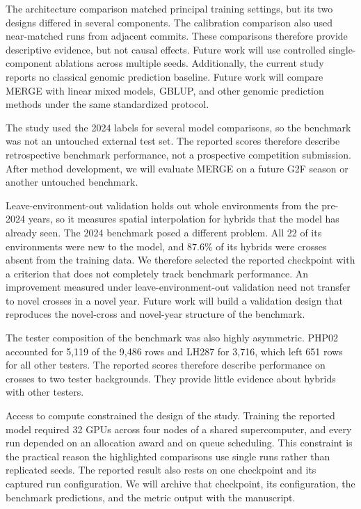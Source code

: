 The architecture comparison matched principal training settings, but its two designs differed in several components. The calibration comparison also used near-matched runs from adjacent commits. These comparisons therefore provide descriptive evidence, but not causal effects. Future work will use controlled single-component ablations across multiple seeds. Additionally, the current study reports no classical genomic prediction baseline. Future work will compare MERGE with linear mixed models, GBLUP, and other genomic prediction methods under the same standardized protocol.

The study used the 2024 labels for several model comparisons, so the benchmark was not an untouched external test set. The reported scores therefore describe retrospective benchmark performance, not a prospective competition submission. After method development, we will evaluate MERGE on a future G2F season or another untouched benchmark.

Leave-environment-out validation holds out whole environments from the pre-2024 years, so it measures spatial interpolation for hybrids that the model has already seen. The 2024 benchmark posed a different problem. All 22 of its environments were new to the model, and $87.6\%$ of its hybrids were crosses absent from the training data. We therefore selected the reported checkpoint with a criterion that does not completely track benchmark performance. An improvement measured under leave-environment-out validation need not transfer to novel crosses in a novel year. Future work will build a validation design that reproduces the novel-cross and novel-year structure of the benchmark.

The tester composition of the benchmark was also highly asymmetric. PHP02 accounted for 5,119 of the 9,486 rows and LH287 for 3,716, which left 651 rows for all other testers. The reported scores therefore describe performance on crosses to two tester backgrounds. They provide little evidence about hybrids with other testers.

Access to compute constrained the design of the study. Training the reported model required 32 GPUs across four nodes of a shared supercomputer, and every run depended on an allocation award and on queue scheduling. This constraint is the practical reason the highlighted comparisons use single runs rather than replicated seeds. The reported result also rests on one checkpoint and its captured run configuration. We will archive that checkpoint, its configuration, the benchmark predictions, and the metric output with the manuscript.

